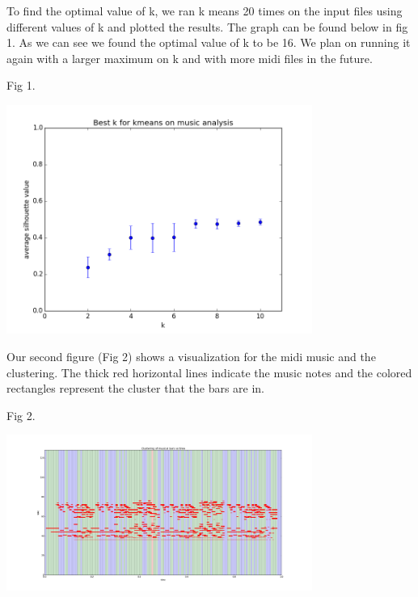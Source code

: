 \documentclass[a4paper, 12pt]{article}
\begin{document}
To find the optimal value of k, we ran k means 20 times on the input files using  
different values of k and plotted the results. The graph can be found below in fig 1. As we can see we found the optimal value of k to be 16. We plan on running it again with a larger maximum on k and with more midi files in the future.

Fig 1.
\centerline{\includegraphics[width=10cm]{best_k_song_2.png}}

Our second figure (Fig 2) shows a visualization for the midi music and the clustering. The thick red horizontal lines indicate the music notes and the colored rectangles represent the cluster that the bars are in.

Fig 2.
\centerline{\includegraphics[width=10cm]{clustering_visualization.png}}
\end{document}
